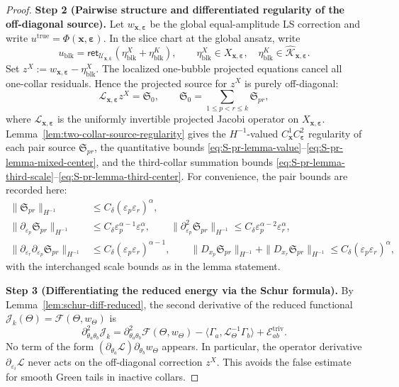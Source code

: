 \documentclass[11pt,reqno,a4paper]{amsart}
\numberwithin{equation}{section}
\theoremstyle{plain}
\theoremstyle{remark}
\theoremstyle{plain}
\begin{document}
\begin{proof}
\smallskip\noindent
\textbf{Step 2 (Pairwise structure and differentiated regularity of the off-diagonal source).}
Let $w_{\mathbf x,\boldsymbol\varepsilon}$ be the global equal-amplitude LS correction and write
$u^{\mathrm{true}}=\Phi(\mathbf x,\boldsymbol\varepsilon)$. In the slice chart at the global ansatz, write
\[
u_{\mathrm{blk}}
=\mathsf{ret}_{\mathcal U_{\mathbf x,\boldsymbol\varepsilon}}
(\eta_{\mathrm{blk}}^X+\eta_{\mathrm{blk}}^K),
\qquad
\eta_{\mathrm{blk}}^X\in X_{\mathbf x,\boldsymbol\varepsilon},
\quad
\eta_{\mathrm{blk}}^K\in\widehat{\mathcal K}_{\mathbf x,\boldsymbol\varepsilon}.
\]
Set $z^X:=w_{\mathbf x,\boldsymbol\varepsilon}-\eta_{\mathrm{blk}}^X$.
The localized one-bubble projected equations cancel all one-collar residuals. Hence the projected source
for $z^X$ is purely off-diagonal:
\begin{equation}\label{eq:sl-source-pairwise}
\mathcal L_{\mathbf x,\boldsymbol\varepsilon}z^X
=\mathfrak S_0,
\qquad
\mathfrak S_0=\sum_{1\le p<r\le k}\mathfrak S_{pr},
\end{equation}
where $\mathcal L_{\mathbf x,\boldsymbol\varepsilon}$ is the uniformly invertible projected Jacobi operator on
$X_{\mathbf x,\boldsymbol\varepsilon}$.
Lemma~\ref{lem:two-collar-source-regularity} gives the
$H^{-1}$-valued $C^1_{\mathbf x}C^2_{\boldsymbol\varepsilon}$ regularity of each
pair source $\mathfrak S_{pr}$, the quantitative bounds
\eqref{eq:S-pr-lemma-value}--\eqref{eq:S-pr-lemma-mixed-center}, and the
third-collar summation bounds
\eqref{eq:S-pr-lemma-third-scale}--\eqref{eq:S-pr-lemma-third-center}.
For convenience, the pair bounds are recorded here:
\begin{align}
\|\mathfrak S_{pr}\|_{H^{-1}}
&\le C_\delta(\varepsilon_p\varepsilon_r)^\alpha,
\label{eq:S-pr-value}\\
\|\partial_{\varepsilon_p}\mathfrak S_{pr}\|_{H^{-1}}
&\le C_\delta\varepsilon_p^{\alpha-1}\varepsilon_r^\alpha,
\qquad
\|\partial_{\varepsilon_p}^2\mathfrak S_{pr}\|_{H^{-1}}
\le C_\delta\varepsilon_p^{\alpha-2}\varepsilon_r^\alpha,
\label{eq:S-pr-scale}\\
\|\partial_{\varepsilon_r}\partial_{\varepsilon_p}\mathfrak S_{pr}\|_{H^{-1}}
&\le C_\delta(\varepsilon_p\varepsilon_r)^{\alpha-1},
\qquad
\|D_{x_p}\mathfrak S_{pr}\|_{H^{-1}}
+\|D_{x_r}\mathfrak S_{pr}\|_{H^{-1}}
\le C_\delta(\varepsilon_p\varepsilon_r)^\alpha,
\label{eq:S-pr-mixed-center}
\end{align}
with the interchanged scale bounds as in the lemma statement.

\smallskip\noindent
\textbf{Step 3 (Differentiating the reduced energy via the Schur formula).}
By Lemma~\ref{lem:schur-diff-reduced}, the second derivative of the reduced
functional $\mathcal J_k(\Theta)=\mathscr F(\Theta,w_\Theta)$ is
\[
\partial_{\theta_a\theta_b}^2\mathcal J_k
=
\partial_{\theta_a\theta_b}^2\mathscr F(\Theta,w_\Theta)
-\langle\Gamma_a,\mathcal L_\Theta^{-1}\Gamma_b\rangle
+\mathcal E^{\mathrm{triv}}_{ab}.
\]
No term of the form
$(\partial_{\theta_a}\mathcal L)\partial_{\theta_b}w_\Theta$ appears.
In particular, the operator derivative $\partial_{\varepsilon_i}\mathcal L$
never acts on the off-diagonal correction $z^X$.  This avoids the
false estimate for smooth Green tails in inactive collars.


\end{proof}
\end{document}
